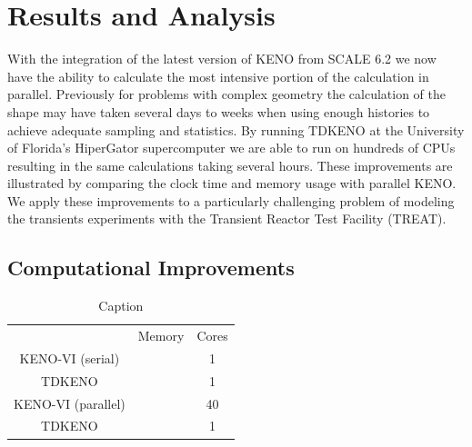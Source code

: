 \documentclass{anstrans}
\renewcommand{\vec}[1]{\bm{#1}} %
\newcommand{\vd}{\bm{\cdot}} %
\newcommand{\grad}{\vec{\nabla}} %
\newcommand{\ud}{\mathop{}\!\mathrm{d}} %
\begin{document}

\section{Results and Analysis}
With the integration of the latest version of KENO from SCALE 6.2 we now have the ability to calculate the most intensive portion of the calculation in parallel.  Previously for problems with complex geometry the calculation of the shape may have taken several days to weeks when using enough histories to achieve adequate sampling and statistics.  By running TDKENO at the University of Florida's HiperGator supercomputer we are able to run on hundreds of CPUs resulting in the same calculations taking several hours.  These improvements are illustrated by comparing the clock time and memory usage with parallel KENO.  We apply these improvements to a particularly challenging problem of modeling the transients experiments with the Transient Reactor Test Facility (TREAT).

\subsection{Computational Improvements}

\begin{table}[h]
    \centering
    \begin{tabular}{c|c|c}
                           & Memory & Cores \\
        KENO-VI (serial)   &        & 1 \\ 
        TDKENO             &        & 1  \\
        KENO-VI (parallel) &        & 40 \\
        TDKENO             &        & 1 \\
    \end{tabular}
    \caption{Caption}
    \label{tab:my_label}
\end{table}
\end{document}
